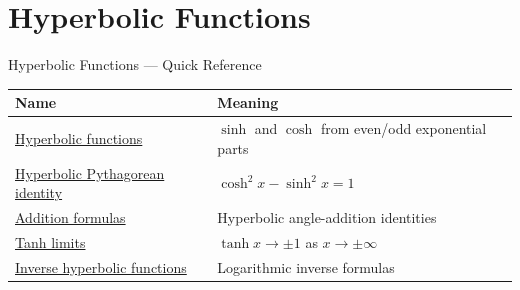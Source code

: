 \section{Hyperbolic Functions}

\begin{toolkitbox}{Hyperbolic Functions --- Quick Reference}
\small
\begin{tabular}{l l}
\toprule
\textbf{Name} & \textbf{Meaning} \\
\midrule
\hyperref[def:hyperbolic]{Hyperbolic functions} & \(\sinh\) and \(\cosh\) from even/odd exponential parts \\
\hyperref[prop:hyperbolic-pythagorean]{Hyperbolic Pythagorean identity} & \(\cosh^2x-\sinh^2x=1\) \\
\hyperref[prop:hyperbolic-addition]{Addition formulas} & Hyperbolic angle-addition identities \\
\hyperref[prop:tanh-limits]{Tanh limits} & \(\tanh x\to\pm 1\) as \(x\to\pm\infty\) \\
\hyperref[def:inverse-hyperbolic]{Inverse hyperbolic functions} & Logarithmic inverse formulas \\
\bottomrule
\end{tabular}
\end{toolkitbox}


